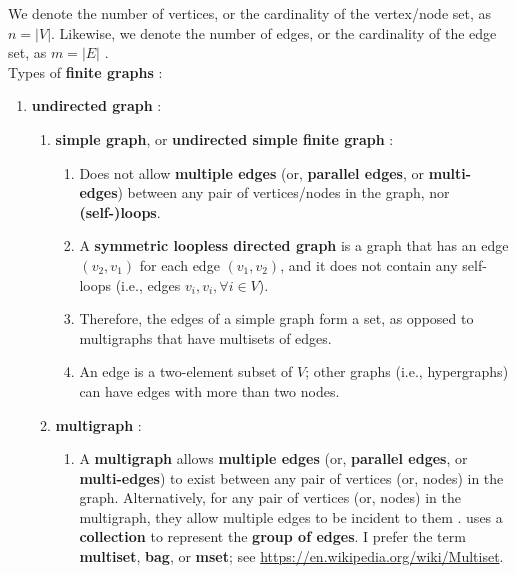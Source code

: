 We denote the number of vertices, or the cardinality of the vertex/node set, as $n = |V|$. Likewise, we denote the number of edges, or the cardinality of the edge set, as $ m = |E|$ \cite[\S52.2, pp. 845]{Goldman2008}. \\

Types of {\bf finite graphs} \cite{WikipediaContributors2018a38}: \vspace{-0.2cm}
\begin{enumerate} \itemsep -4pt
\item {\bf undirected graph} \cite{WikipediaContributors2018a38}: \vspace{-0.2cm}
	\begin{enumerate} \itemsep -2pt
	\item {\bf simple graph}, or {\bf undirected simple finite graph} \cite{WikipediaContributors2018a38}: \vspace{-0.2cm}
		\begin{enumerate} \itemsep -1pt
		\item Does not allow {\bf multiple edges} (or, {\bf parallel edges}, or {\bf multi-edges}) between any pair of vertices/nodes in the graph, nor {\bf (self-)loops}.
		\item A {\bf symmetric loopless directed graph} is a graph that has an edge $(v_{2}, v_{1})$ for each edge $(v_{1}, v_{2})$, and it does not contain any self-loops (i.e., edges $v_{i}, v_{i}, \forall i \in V$).
		\item Therefore, the edges of a simple graph form a set, as opposed to multigraphs that have multisets of edges.
		\item An edge is a two-element subset of $V$; other graphs (i.e., hypergraphs) can have edges with more than two nodes.
		\end{enumerate}
	\item {\bf multigraph} \cite{WikipediaContributors2018a39}: \vspace{-0.2cm}
		\begin{enumerate} %
		\item A {\bf multigraph} allows {\bf multiple edges} (or, {\bf parallel edges}, or {\bf multi-edges}) to exist between any pair of vertices (or, nodes) in the graph. Alternatively, for any pair of vertices (or, nodes) in the multigraph, they allow multiple edges to be incident to them \cite{WikipediaContributors2018a39}. \cite[\S13.1, pp. 596]{Goodrich2011} uses a {\bf collection} to represent the {\bf group of edges}. I prefer the term {\bf multiset}, {\bf bag}, or {\bf mset}; see \url{https://en.wikipedia.org/wiki/Multiset}.

\end{enumerate}
\end{enumerate}
\end{enumerate}
